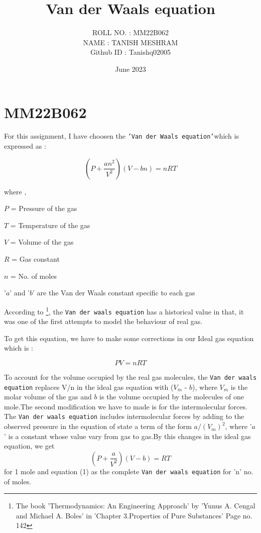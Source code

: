 \documentclass{article}
\title{Van der Waals equation}
\author{ROLL NO. : MM22B062 \\ NAME : TANISH MESHRAM \\ Github ID : Tanishq02005}
\date{June 2023}
\begin{document}
\maketitle

\section*{MM22B062}

For this assignment, I have choosen the \texttt{'Van der Waals equation'}which is expressed as :

\begin{equation}
\left(P + \frac{an^2}{V^2}\right) \left(V - bn \right) = nRT
\end{equation}

where , 
\begin{center}
    $P$ = Pressure of the gas
\end{center}
\begin{center}
    $T$ = Temperature of the gas
\end{center} 
\begin{center}
    $V$ = Volume of the gas
\end{center}
\begin{center}
    $R$ = Gas constant
\end{center}
\begin{center}
    $n$ = No. of moles
\end{center}
\begin{center}
    '$a$' and '$b$' are the Van der Waals constant specific to each gas
\end{center} 

According to \footnote{The book 'Thermodynamics: An Engineering Approach' by 'Yunus A. Cengal and Michael A. Boles' in 'Chapter 3.Properties of Pure Substances' Page no. 142}, the  \texttt{Van der waals equation} has a historical value in that, it was one of the first attempts to model the behaviour of real gas.

To get this equation, we have to make some corrections in our Ideal gas equation which is : 

\begin{equation}
PV = nRT
\end{equation}

To account for the volume occupied by the real gas molecules, the \texttt{Van der waals equation} replaces V/n in the ideal gas equation with ($V_{m}$ - $b$), where $V_{m}$ is the molar volume of the gas and $b$ is the volume occupied by the molecules of one mole.The second modification we have to made is for the intermolecular forces. The \texttt{Van der waals equation} includes intermolecular forces by adding to the observed pressure in the equation of state a term of the form $a/(V_m)^2$, where '$a$' is a constant whose value vary from gas to gas.By this changes in the ideal gas equation, we get
\begin{equation}
    \left(P + \frac{a}{V^2}\right) \left(V - b \right) = RT
\end{equation}
for 1 mole and equation (1) as the complete \texttt{Van der waals equation} for 'n' no. of moles.
\end{document}
